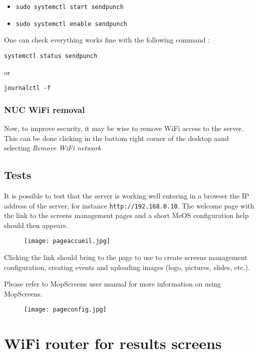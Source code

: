 \documentclass[a4paper]{ffco-rapport}
\begin{document}
			\begin{itemize}
				\item \verb|sudo systemctl start sendpunch|
				\item \verb|sudo systemctl enable sendpunch|
			\end{itemize}

			One can check everything works fine with the following command :

				\verb|systemctl status sendpunch|
			
			or
			
				\verb|journalctl -f|
			
			

	\subsection{NUC WiFi removal}
		Now, to improve security, it may be wise to remove WiFi access to the server. This can be done clicking in the bottom right corner of the desktop aand selecting \emph{Remove WiFi network}

\section{Tests}
	It is possible to test that the server is working well entering in a browser the IP address of the server, for instance \verb|http://192.168.0.10|. The welcome page with the link to the screens management pages and a short MeOS configuration help should then appears.
	
\begin{figure}[!ht]
	\centering
		\texttt{[image: pageaccueil.jpg]}
	\label{fig:b}
\end{figure}

Clicking the link should bring to the page to use to create screens management configuration, creating events and uploading images (logo, pictures, slides, etc.).

Please refer to MopScreens user manual for more information on using MopScreens.

\begin{figure}[!ht]
	\centering
		\texttt{[image: pageconfig.jpg]}
	\label{fig:c}
\end{figure}

\chapter{WiFi router for results screens}
\end{document}
